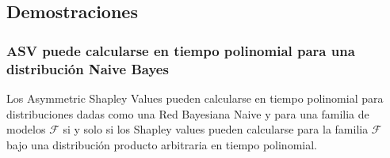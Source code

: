 

\subsection{Demostraciones}

\subsubsection{ASV puede calcularse en tiempo polinomial para una distribución Naive Bayes} \label{subsubSection:proofASVPolynomialNaiveBayes}

\begin{theorem}
Los Asymmetric Shapley Values pueden calcularse en tiempo polinomial para distribuciones dadas como una Red Bayesiana Naive y para una familia de modelos \(\mathcal{F}\) si y solo si los Shapley values pueden calcularse para la familia \(\mathcal{F}\) bajo una distribución producto arbitraria en tiempo polinomial.
\end{theorem}

